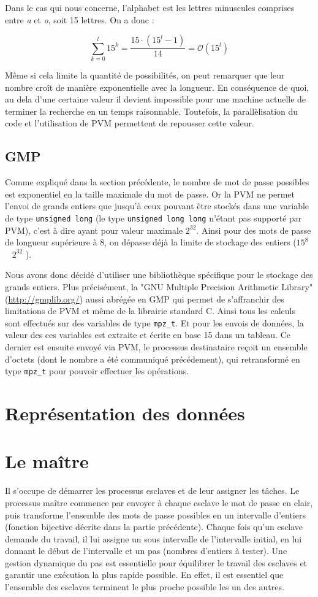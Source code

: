 \documentclass[a4paper,11pt]{article}
\begin{document}
Dans le cas qui nous concerne, l'alphabet est les lettres minuscules comprises entre \emph{a} et \emph{o}, soit 15 lettres. On a donc :

\[
\sum_{k=0}^{l}15^k = \frac{15 \cdot (15^l - 1)}{14} = \mathcal{O}(15^l)
\]

Même si cela limite la quantité de possibilités, on peut remarquer que leur nombre croît de manière exponentielle avec la longueur. En conséquence de quoi, au dela d'une certaine valeur il devient impossible pour une machine actuelle de terminer la recherche en un temps raisonnable. Toutefois, la parallèlisation du code et l'utilisation de PVM permettent de repousser cette valeur.

\subsection{GMP}
Comme expliqué dans la section précédente, le nombre de mot de passe possibles est exponentiel en la taille maximale du mot de passe. Or la PVM ne permet l'envoi de grands entiers que jusqu'à ceux pouvant être stockés dans une variable de type  \texttt{unsigned long} (le type \texttt{unsigned long long} n'étant pas supporté par PVM), c'est à dire ayant pour valeur maximale $2^{32}$. Ainsi pour des mots de passe de longueur supérieure à 8, on dépasse déjà la limite de stockage des entiers ($15^{8}$ ~ $2^{32}$ ). 

Nous avons donc décidé d'utiliser une bibliothèque spécifique pour le stockage des grands entiers. Plus précisément, la "GNU Multiple Precision Arithmetic Library" (\url{http://gmplib.org/}) aussi abrégée en GMP qui permet de s'affranchir des limitations de PVM et même de la librairie standard C.
Ainsi tous les calculs sont effectués sur des variables de type \texttt{mpz\_t}. Et pour les envois de données, la valeur des ces variables est extraite et écrite en base 15 dans un tableau. Ce dernier est ensuite envoyé via PVM, le processus destinataire reçoit un ensemble d'octets (dont le nombre a été communiqué précédement), qui retransformé en type \texttt{mpz\_t} pour pouvoir effectuer les opérations.

\section{Représentation des données}


\section{Le maître}
Il s'occupe de démarrer les processus esclaves et de leur assigner les tâches. Le processus maître commence par envoyer à chaque esclave le mot de passe en clair, puis transforme l'ensemble des mots de passe possibles en un intervalle d'entiers (fonction bijective décrite dans la partie précédente). Chaque fois qu'un esclave demande du travail, il lui assigne un sous intervalle de l'intervalle initial, en lui donnant le début de l'intervalle et un pas (nombres d'entiers à tester).
Une gestion dynamique du pas est essentielle pour équilibrer le travail des esclaves et garantir une exécution la plus rapide possible. En effet, il est essentiel que l'ensemble des esclaves terminent le plus proche possible les un des autres.
\end{document}
